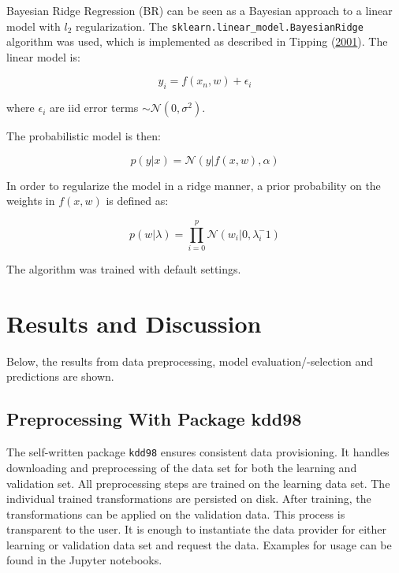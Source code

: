 \documentclass[
  11pt,
  a4paper,
  DIV=12,captions=tableheading,oneside,titlepage]{scrbook}
\begin{document}
Bayesian Ridge Regression (BR) can be seen as a Bayesian approach to a linear model with \(l_2\) regularization. The \texttt{sklearn.linear\_model.BayesianRidge} algorithm was used, which is implemented as described in Tipping (\protect\hyperlink{ref-tipping2001sparse}{2001}). The linear model is:

\begin{equation}
y_i = f(x_n, w) + \epsilon_i
\label{eq:bayesion-linear-model-sk}
\end{equation}

where \(\epsilon_i\) are iid error terms \(\sim \mathcal{N}(0, \sigma^2)\).

The probabilistic model is then:

\begin{equation}
p(y|x) =\mathcal{N}(y|f(x,w), \alpha)
\label{eq:bayesian-prob-model}
\end{equation}

In order to regularize the model in a ridge manner, a prior probability on the weights in \(f(x,w)\) is defined as:

\begin{equation}
p(w|\lambda) = \prod_{i=0}^p \mathcal{N}(w_i|0, \lambda_i^-1)
\label{eq:prior-alpha}
\end{equation}

The algorithm was trained with default settings.

\hypertarget{results-and-discussion}{%
\chapter{Results and Discussion}\label{results-and-discussion}}

Below, the results from data preprocessing, model evaluation/-selection and predictions are shown.

\hypertarget{preprocessing-with-package-kdd98}{%
\section{Preprocessing With Package kdd98}\label{preprocessing-with-package-kdd98}}

The self-written package \texttt{kdd98} ensures consistent data provisioning. It handles downloading and preprocessing of the data set for both the learning and validation set. All preprocessing steps are trained on the learning data set. The individual trained transformations are persisted on disk. After training, the transformations can be applied on the validation data. This process is transparent to the user. It is enough to instantiate the data provider for either learning or validation data set and request the data. Examples for usage can be found in the Jupyter notebooks.
\end{document}

